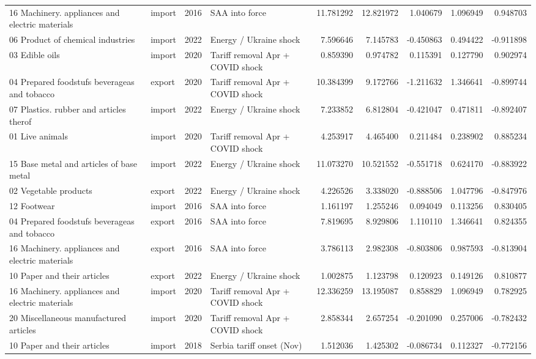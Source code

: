 \begin{tabular}{llrlrrrrr}
16 Machinery. appliances and electric materials & import & 2016 & SAA into force & 11.781292 & 12.821972 & 1.040679 & 1.096949 & 0.948703 \\
06 Product of chemical industries & import & 2022 & Energy / Ukraine shock & 7.596646 & 7.145783 & -0.450863 & 0.494422 & -0.911898 \\
03 Edible oils & import & 2020 & Tariff removal Apr + COVID shock & 0.859390 & 0.974782 & 0.115391 & 0.127790 & 0.902974 \\
04 Prepared foodstufs beverageas and tobacco & export & 2020 & Tariff removal Apr + COVID shock & 10.384399 & 9.172766 & -1.211632 & 1.346641 & -0.899744 \\
07 Plastics. rubber and articles therof & import & 2022 & Energy / Ukraine shock & 7.233852 & 6.812804 & -0.421047 & 0.471811 & -0.892407 \\
01 Live animals & import & 2020 & Tariff removal Apr + COVID shock & 4.253917 & 4.465400 & 0.211484 & 0.238902 & 0.885234 \\
15 Base metal and articles of base metal & import & 2022 & Energy / Ukraine shock & 11.073270 & 10.521552 & -0.551718 & 0.624170 & -0.883922 \\
02 Vegetable products & export & 2022 & Energy / Ukraine shock & 4.226526 & 3.338020 & -0.888506 & 1.047796 & -0.847976 \\
12 Footwear & import & 2016 & SAA into force & 1.161197 & 1.255246 & 0.094049 & 0.113256 & 0.830405 \\
04 Prepared foodstufs beverageas and tobacco & export & 2016 & SAA into force & 7.819695 & 8.929806 & 1.110110 & 1.346641 & 0.824355 \\
16 Machinery. appliances and electric materials & export & 2016 & SAA into force & 3.786113 & 2.982308 & -0.803806 & 0.987593 & -0.813904 \\
10 Paper and their articles & export & 2022 & Energy / Ukraine shock & 1.002875 & 1.123798 & 0.120923 & 0.149126 & 0.810877 \\
16 Machinery. appliances and electric materials & import & 2020 & Tariff removal Apr + COVID shock & 12.336259 & 13.195087 & 0.858829 & 1.096949 & 0.782925 \\
20 Miscellaneous manufactured articles & import & 2020 & Tariff removal Apr + COVID shock & 2.858344 & 2.657254 & -0.201090 & 0.257006 & -0.782432 \\
10 Paper and their articles & import & 2018 & Serbia tariff onset (Nov) & 1.512036 & 1.425302 & -0.086734 & 0.112327 & -0.772156 \\

\end{tabular}
